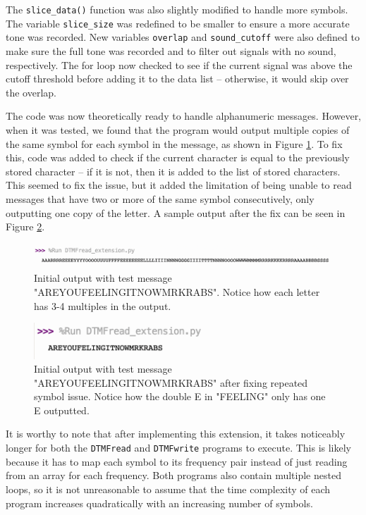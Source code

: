 \documentclass[12pt]{iopart}
\begin{document}
The \verb|slice_data()| function was also slightly modified to handle more symbols.
The variable \verb|slice_size| was redefined to be smaller to ensure a more accurate tone was recorded.
New variables \verb|overlap| and \verb|sound_cutoff| were also defined to make sure the full tone was recorded and to filter out signals with no sound, respectively.
The for loop now checked to see if the current signal was above the cutoff threshold before adding it to the data list -- otherwise, it would skip over the overlap.

The code was now theoretically ready to handle alphanumeric messages.
However, when it was tested, we found that the program would output multiple copies of the same symbol for each symbol in the message, as shown in Figure \ref{fig:extension_output_bad}.
To fix this, code was added to check if the current character is equal to the previously stored character -- if it is not, then it is added to the list of stored characters.
This seemed to fix the issue, but it added the limitation of being unable to read messages that have two or more of the same symbol consecutively, only outputting one copy of the letter.
A sample output after the fix can be seen in Figure \ref{fig:extension_output}.

\begin{figure}[h!tbp]
  \begin{center}
 \item[]\includegraphics[width=1\textwidth]{extension_output_bad.png}
  \caption{\label{fig:extension_output_bad}
  Initial output with test message "AREYOUFEELINGITNOWMRKRABS". 
  Notice how each letter has 3-4 multiples in the output.
  }
  \end{center}
\end{figure}

\begin{figure}[h!tbp]
  \begin{center}
 \item[]\includegraphics[width=0.6\textwidth]{extension_output.png}
  \caption{\label{fig:extension_output}
  Initial output with test message "AREYOUFEELINGITNOWMRKRABS" after fixing repeated symbol issue. Notice how the double E in "FEELING" only has one E outputted.
  }
  \end{center}
\end{figure}

It is worthy to note that after implementing this extension, it takes noticeably longer for both the \verb|DTMFread| and \verb|DTMFwrite| programs to execute.
This is likely because it has to map each symbol to its frequency pair instead of just reading from an array for each frequency.
Both programs also contain multiple nested loops, so it is not unreasonable to assume that the time complexity of each program increases quadratically with an increasing number of symbols.
\end{document}
